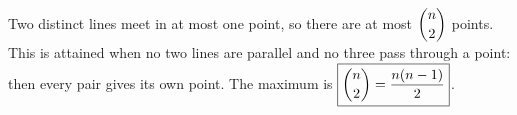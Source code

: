 Two distinct lines meet in at most one point, so there are at most $\dbinom n2$ points. This is attained when no two lines are parallel and no three pass through a point: then every pair gives its own point. The maximum is $\boxed{\dbinom n2=\dfrac{n(n-1)}{2}}$.
